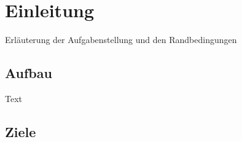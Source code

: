 \chapter{Einleitung}
\label{sec:einl}

Erläuterung der Aufgabenstellung und den Randbedingungen

\section{Aufbau}

Text

\section{Ziele}